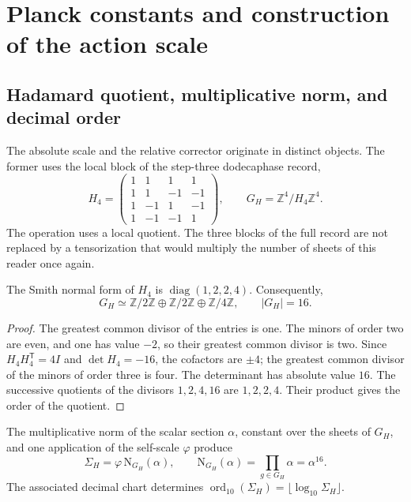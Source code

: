 \section{Planck constants and construction of the action scale}
\label{sec:action}
\subsection{Hadamard quotient, multiplicative norm, and decimal order}

The absolute scale and the relative corrector originate in distinct
objects. The former uses the local block of the step-three
dodecaphase record,
\begin{equation}
 H_4=\begin{pmatrix}
 1&1&1&1\\1&1&-1&-1\\1&-1&1&-1\\1&-1&-1&1
 \end{pmatrix},\qquad
 G_H=\mathbb Z^4/H_4\mathbb Z^4.
 \label{eq:el-h4}
\end{equation}
The operation uses a local quotient. The three blocks of the full
record are not replaced by a tensorization that would multiply
the number of sheets of this reader once again.

\begin{lemma}
The Smith normal form of \(H_4\) is
\(\operatorname{diag}(1,2,2,4)\). Consequently,
\[
 G_H\simeq\mathbb Z/2\mathbb Z\oplus\mathbb Z/2\mathbb Z
 \oplus\mathbb Z/4\mathbb Z,\qquad |G_H|=16.
\]
\end{lemma}
\begin{proof}
The greatest common divisor of the entries is one. The minors of order two
are even, and one has value \(-2\), so their greatest common divisor
is two. Since \(H_4H_4^{\mathsf T}=4I\) and \(\det H_4=-16\), the
cofactors are \(\pm4\); the greatest common divisor of the minors of order
three is four. The determinant has absolute value \(16\). The successive quotients of the divisors
\(1,2,4,16\) are \(1,2,2,4\). Their product gives the order of the quotient.
\end{proof}

\begin{definition}
The multiplicative norm of the scalar section \(\alpha\), constant
over the sheets of \(G_H\), and one application of the self-scale
\(\varphi\) produce
\begin{equation}
 \Sigma_H=\varphi\,\mathrm N_{G_H}(\alpha),\qquad
 \mathrm N_{G_H}(\alpha)=\prod_{g\in G_H}\alpha=\alpha^{16}.
 \label{eq:el-lector-determinantal}
\end{equation}
The associated decimal chart determines
\(\operatorname{ord}_{10}(\Sigma_H)=\lfloor\log_{10}\Sigma_H\rfloor\).
\end{definition}

